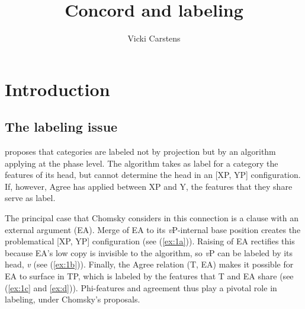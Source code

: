 \documentclass[output=paper
,modfonts
,nonflat]{langsci/langscibook}
\title{Concord and labeling}
\author{%
	Vicki Carstens\affiliation{Southern Illinois University}
}
\begin{document}
	\maketitle
\section{Introduction} \label{sec:1}
\subsection{The labeling issue} \label{sec:1.1}
\citet{Chomsky2013, Chomsky2015} proposes that categories are labeled not by projection but by an algorithm applying at the phase level. The algorithm takes as label for a category the features of its head, but cannot determine the head in an [XP, YP] configuration. If, however, Agree has applied between XP and Y, the features that they share serve as label. 

The principal case that Chomsky considers in this connection is a clause with an external argument (EA). Merge of EA to its \textit{v}P-internal base position creates the problematical [XP, YP] configuration (see (\ref{ex:1a})). Raising of EA rectifies this because EA’s low copy is invisible to the algorithm, so \textit{v}P can be labeled by its head, \textit{v} (see (\ref{ex:1b})). Finally, the Agree relation (T, EA) makes it possible for EA to surface in TP, which is labeled by the features that T and EA share (see (\ref{ex:1c} and \ref{ex:d})). Phi-features and agreement thus play a pivotal role in labeling, under Chomsky's proposals. 
\end{document}
